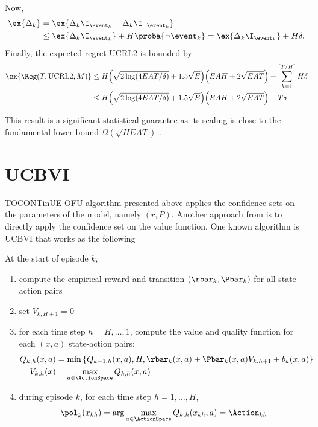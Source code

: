            Now,
            \begin{align*}
                \ex{\Delta_k}
                &=\ex{\Delta_k\I_{\event_k} +\Delta_k\I_{\neg\event_k}} \\
                &\le \ex{\Delta_k\I_{\event_k}} +H\proba{\neg\event_k} =\ex{\Delta_k\I_{\event_k}} +H\delta.
            \end{align*}
            Finally, the expected regret UCRL2 is bounded by
            \begin{align*}
                \ex{\Reg(T,\mathrm{UCRL2},M)} 
                &\le H\Big(\sqrt{2\log(4EAT/\delta)} +1.5\sqrt{E}\Big) \Big(EAH +2\sqrt{EAT}\Big) +\sum_{k=1}^{\lceil T/H\rceil}H\delta \\
                &\le H\Big(\sqrt{2\log(4EAT/\delta)} +1.5\sqrt{E}\Big) \Big(EAH +2\sqrt{EAT}\Big) +T\delta
            \end{align*}
            
            This result is a significant statistical guarantee as its scaling is close to the fundamental lower bound $\Omega(\sqrt{HEAT})$ \cite{jakschNearoptimalRegretBounds; osbandLowerBoundsRegret2016}.
    
    \section{UCBVI}
    \label{sec:ucbvi}
    TOCONTinUE
    OFU algorithm presented above applies the confidence sets on the parameters of the model, namely $(r,P)$. Another approach from \cite{gheshlaghiazarMinimaxRegretBounds2017} is to directly apply the confidence set on the value function. One known algorithm is UCBVI that works as the following
    
    At the start of episode $k$,
    \begin{enumerate}
    \item compute the empirical reward and transition $(\rbar_k,\Pbar_k)$ for all state-action pairs
    \item set $V_{k,H+1}=0$
    \item for each time step $h=H,\dots,1$, compute the value and quality function for each $(x,a)$ state-action pairs:
    \begin{align*}
    Q_{k,h}(x,a) &=\min\left\{Q_{k-1,h}(x,a), H, \rbar_k(x,a) +\Pbar_k(x,a)V_{k,h+1} +b_k(x,a)\right\} \\
    V_{k,h}(x) &= \max_{a\in\ActionSpace}Q_{k,h}(x,a)
    \end{align*}
    \item during episode $k$, for each time step $h=1,\dots,H$, 
    \begin{align*}
    \pol_{k}(x_{kh}) =\arg\max_{a\in\ActionSpace}Q_{k,h}(x_{kh},a)=\Action_{kh}
    \end{align*}
    \end{enumerate}
    
